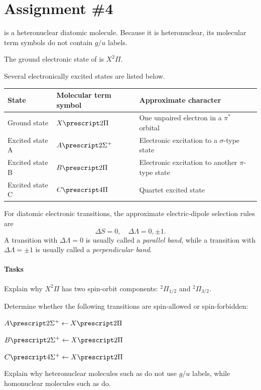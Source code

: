 
\section{Assignment \#4}

\begin{problem}[note =
    Molecular Term Symbols and Electronic Band Types in \ce{NO}]
   is a heteronuclear diatomic molecule. Because it is heteronuclear, its
  molecular term symbols do not contain $g/u$ labels.

  The ground electronic state of  is $X^2\Pi$.

  Several electronically excited states are listed below.
  \begin{center}
    \begin{tabular}{*3l}
      \toprule
      \textbf{State} & \textbf{Molecular term symbol} &
      \textbf{Approximate character}\\
      \midrule
      Ground  state   & $X \prescript2{}\Pi$       &
      One unpaired electron in a $\pi^*$ orbital\\
      Excited state A & $A \prescript2{}\Sigma^+$ & 
      Electronic excitation to a $\sigma$-type state\\
      Excited state B & $B \prescript2{}\Pi$ & 
      Electronic excitation to another $\pi$-type state\\
      Excited state C & $C \prescript4{}\Pi$ & 
      Quartet excited state\\
      \bottomrule
    \end{tabular}
  \end{center}
  For diatomic electronic transitions, the approximate electric-dipole
  selection rules are
  \[
    \Delta S = 0, \quad \Delta \Lambda = 0, \pm 1.
  \]
  A transition with $\Delta \Lambda = 0$ is usually called a
  \emph{parallel band}, while a transition with $\Delta \Lambda = \pm 1$ is
  usually called a \emph{perpendicular band}.
  \paragraph{Tasks}
  \begin{enumext}
    \item Explain why $X^2\Pi$ has two spin-orbit components:
    ${}^2\Pi_{1/2}$ and ${}^2\Pi_{3/2}$.
    \item Determine whether the following transitions are spin-allowed or
    spin-forbidden:
    \begin{enumext}[columns = 3]
      \item $A \prescript2{}\Sigma^+ \leftarrow X \prescript2{}\Pi$
      \item $B \prescript2{}\Sigma^+ \leftarrow X \prescript2{}\Pi$
      \item $C \prescript4{}\Sigma^+ \leftarrow X \prescript2{}\Pi$
    \end{enumext}
    \item Explain why heteronuclear molecules such as  do not use $g/u$
    labels, while homonuclear molecules such as  do.
  \end{enumext}
\end{problem}
